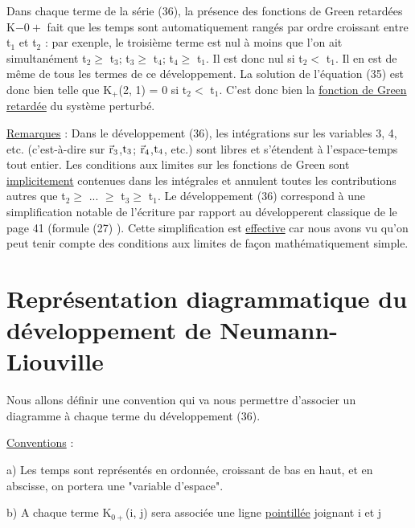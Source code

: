Dans chaque terme de la série (36), la présence des fonctions de
Green retardées K$-{0+}$ fait que les temps sont automatiquement rangés par
ordre croissant entre t$_1$ et t$_2$ : par exenple, le troisième terme est nul
à moins que l'on ait simultanément  t$_2\geqslant$ t$_3$; t$_3\geqslant$ t$_4$; t$_4\geqslant$ t$_1$. Il est donc
nul si t$_2<$ t$_1$. Il en est de même de tous les termes de ce développement.
La solution de l'équation (35) est donc bien telle que K$_+$(2, 1) = 0 si
t$_2<$ t$_1$. C'est donc bien la \ul{fonction de Green retardée} du système perturbé.

\ul{Remarques} :
Dans le développement (36), les intégrations sur les variables 3, 4, etc.
(c'est-à-dire sur $\vec{\text{r}}_3$,$\text{t}_3$; $\vec{\text{r}}_4$,$\text{t}_4$, etc.) sont libres et s'étendent à l'espace-temps tout entier.
Les conditions aux limites sur les fonctions de Green
sont \ul{implicitement} contenues dans les intégrales et annulent toutes les contributions
autres que t$_2\geqslant$ ... $\geqslant$ t$_3\geqslant$ t$_1$. Le développement (36) correspond
à une simplification notable de l'écriture par rapport au développerent
classique de le page 41 (formule (27) ). Cette simplification est \ul{effective}
car nous avons vu qu'on peut tenir compte des conditions aux limites de façon
mathématiquement simple.
\section{Représentation diagrammatique du développement de Neumann-Liouville}%

Nous allons définir une convention qui va nous permettre d'associer un diagramme à chaque terme du développement (36).

\ul{Conventions} :

a) Les temps sont représentés en ordonnée, croissant de bas en
haut, et en abscisse, on portera une "variable d'espace".

b) A chaque terme K$_{0+}$(i, j) sera associée une ligne \ul{pointillée}
joignant i et j

